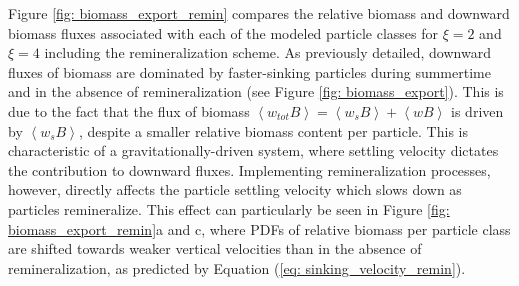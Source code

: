\documentclass[article,linenumbers]{agujournal2019}
\begin{document}
	Figure \ref{fig: biomass_export_remin} compares the relative biomass and downward biomass fluxes associated with each of the modeled particle classes for $\xi = 2$ and $\xi = 4$ including the remineralization scheme. As previously detailed, downward fluxes of biomass are dominated by faster-sinking particles during summertime and in the absence of remineralization (see Figure \ref{fig: biomass_export}). This is due to the fact that the flux of biomass $\left<w_{tot}B\right> = \left<w_sB\right> + \left<wB\right>$ is driven by $\left<w_sB\right>$, despite a smaller relative biomass content per particle. This is characteristic of a gravitationally-driven system, where settling velocity dictates the contribution to downward fluxes. Implementing remineralization processes, however, directly affects the particle settling velocity which slows down as particles remineralize. This effect can particularly be seen in Figure \ref{fig: biomass_export_remin}a and c, where PDFs of relative biomass per particle class are shifted towards weaker vertical velocities than in the absence of remineralization, as predicted by Equation (\ref{eq: sinking_velocity_remin}).
\end{document}
